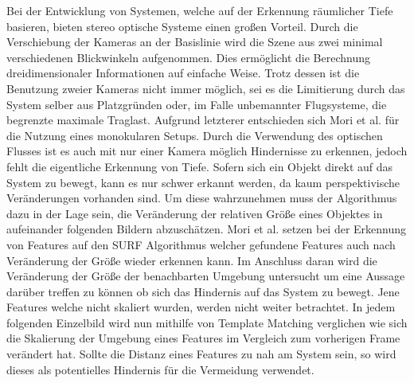 \noindent
Bei der Entwicklung von Systemen, welche auf der Erkennung räumlicher Tiefe basieren, bieten stereo optische Systeme einen großen Vorteil. Durch die Verschiebung der Kameras an der Basislinie wird die Szene aus zwei minimal verschiedenen Blickwinkeln aufgenommen. Dies ermöglicht die Berechnung dreidimensionaler Informationen auf einfache Weise. Trotz dessen ist die Benutzung zweier Kameras nicht immer möglich, sei es die Limitierung durch das System selber aus Platzgründen oder, im Falle unbemannter Flugsysteme, die begrenzte maximale Traglast. Aufgrund letzterer entschieden sich Mori et al. \cite{mori2013first} für die Nutzung eines monokularen Setups. Durch die Verwendung des optischen Flusses ist es auch mit nur einer Kamera möglich Hindernisse zu erkennen, jedoch fehlt die eigentliche Erkennung von Tiefe. Sofern sich ein Objekt direkt auf das System zu bewegt, kann es nur schwer erkannt werden, da kaum perspektivische Veränderungen vorhanden sind. Um diese wahrzunehmen muss der Algorithmus dazu in der Lage sein, die Veränderung der relativen Größe eines Objektes in aufeinander folgenden Bildern abzuschätzen. Mori et al. setzen bei der Erkennung von Features auf den SURF Algorithmus \cite{bay2006surf} welcher gefundene Features auch nach Veränderung der Größe wieder erkennen kann. Im Anschluss daran wird die Veränderung der Größe der benachbarten Umgebung untersucht um eine Aussage darüber treffen zu können ob sich das Hindernis auf das System zu bewegt. Jene Features welche nicht skaliert wurden, werden nicht weiter betrachtet. In jedem folgenden Einzelbild wird nun mithilfe von Template Matching verglichen wie sich die Skalierung der Umgebung eines Features im Vergleich zum vorherigen Frame verändert hat. Sollte die Distanz eines Features zu nah am System sein, so wird dieses als potentielles Hindernis für die Vermeidung verwendet.
